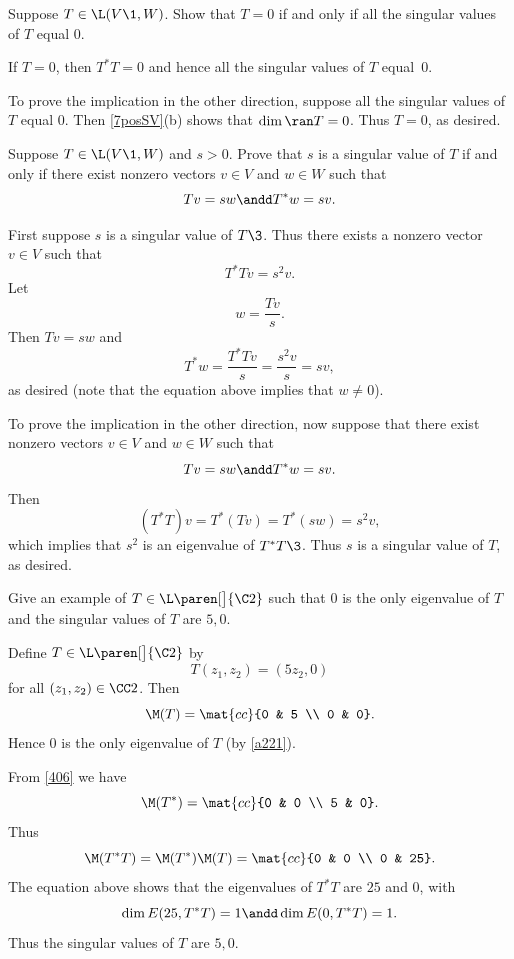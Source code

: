 
\exercise
Suppose $T \in \L(V\1, W)$. Show that $T = 0$ if and only if all the singular values of $T$ equal $0$.

\begin{Solution}
If $T = 0$, then $T^*T=0$ and hence all the singular values of $T$ equal~$0$.

To prove the implication in the other direction, suppose all the singular values of $T$ equal $0$. Then \ref{7posSV}(b) shows that
$\dim \ran T = 0$. Thus $T = 0$, as desired.
\end{Solution}

\exercise
Suppose $T \in \L(V\1, W)$ and $s > 0$. Prove that $s$ is a singular value of $T$ if and only if there exist nonzero vectors $v \in V$ and
$w \in W$ such that \label{2Schmidt}
\[
Tv = sw \andd T^* w = sv.
\]
\exercisedisplayend
{}

\begin{Solution}
First suppose $s$ is a singular value of $T\3$. Thus there exists a nonzero vector $v \in V$ such that
\[
T^*T v = s^2 v.
\]
Let
\[
w = \frac{Tv}{s}.
\]
Then $Tv = sw$ and
\[
T^*w = \frac{T^*Tv}{s} = \frac{s^2 v}{s} = sv,
\]
as desired (note that the equation above implies that $w \ne 0$).

To prove the implication in the other direction, now suppose that there exist nonzero vectors $v \in V$ and
$w \in W$ such that
\[
Tv = sw \andd T^* w = sv.
\]
Then
\[
(T^*T)v = T^*(Tv) = T^*(sw) = s^2 v,
\]
which implies that $s^2$ is an eigenvalue of $T^*T\3$. Thus $s$ is a singular value of $T$, as desired.
\end{Solution}

\exercise
Give an example of $T \in \L\paren[\big]{\C2}$ such that $0$ is the only eigenvalue of $T$ and the singular values of $T$ are $5, 0$.

\begin{Solution}
Define $T \in \L\paren[\big]{\C2}$ by
\[
T(z_1, z_2) = (5 z_2, 0)
\]
for all $(z_1, z_2) \in \CC2$. Then
\[
\M(T) = \mat{cc}
{0 & 5 \\
0 & 0}.
\]
Hence $0$ is the only eigenvalue of $T$ (by \ref{a221}).

From \ref{406} we have
\[
\M(T^*) =  \mat{cc}
{0 & 0 \\
5 & 0}.
\]
Thus
\[
\M(T^*T) = \M(T^*) \M(T) = \mat{cc}
{0 & 0 \\
0 & 25}.
\]
The equation above shows that the eigenvalues of $T^*T$ are $25$ and $0$, with
\[
\dim E(25, T^*T) = 1 \andd \dim E(0, T^*T) = 1.
\]
Thus the singular values of $T$ are $5, 0$.
\end{Solution}

